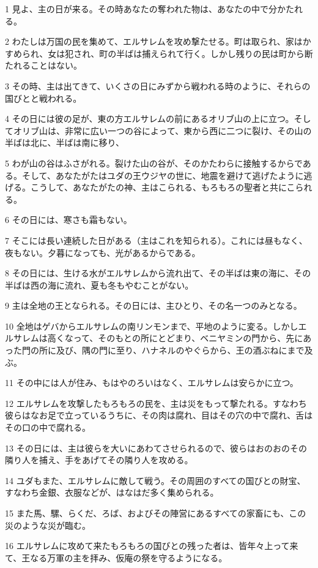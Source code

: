 \par 1 見よ、主の日が来る。その時あなたの奪われた物は、あなたの中で分かたれる。
\par 2 わたしは万国の民を集めて、エルサレムを攻め撃たせる。町は取られ、家はかすめられ、女は犯され、町の半ばは捕えられて行く。しかし残りの民は町から断たれることはない。
\par 3 その時、主は出てきて、いくさの日にみずから戦われる時のように、それらの国びとと戦われる。
\par 4 その日には彼の足が、東の方エルサレムの前にあるオリブ山の上に立つ。そしてオリブ山は、非常に広い一つの谷によって、東から西に二つに裂け、その山の半ばは北に、半ばは南に移り、
\par 5 わが山の谷はふさがれる。裂けた山の谷が、そのかたわらに接触するからである。そして、あなたがたはユダの王ウジヤの世に、地震を避けて逃げたように逃げる。こうして、あなたがたの神、主はこられる、もろもろの聖者と共にこられる。
\par 6 その日には、寒さも霜もない。
\par 7 そこには長い連続した日がある（主はこれを知られる）。これには昼もなく、夜もない。夕暮になっても、光があるからである。
\par 8 その日には、生ける水がエルサレムから流れ出て、その半ばは東の海に、その半ばは西の海に流れ、夏も冬もやむことがない。
\par 9 主は全地の王となられる。その日には、主ひとり、その名一つのみとなる。
\par 10 全地はゲバからエルサレムの南リンモンまで、平地のように変る。しかしエルサレムは高くなって、そのもとの所にとどまり、ベニヤミンの門から、先にあった門の所に及び、隅の門に至り、ハナネルのやぐらから、王の酒ぶねにまで及ぶ。
\par 11 その中には人が住み、もはやのろいはなく、エルサレムは安らかに立つ。
\par 12 エルサレムを攻撃したもろもろの民を、主は災をもって撃たれる。すなわち彼らはなお足で立っているうちに、その肉は腐れ、目はその穴の中で腐れ、舌はその口の中で腐れる。
\par 13 その日には、主は彼らを大いにあわてさせられるので、彼らはおのおのその隣り人を捕え、手をあげてその隣り人を攻める。
\par 14 ユダもまた、エルサレムに敵して戦う。その周囲のすべての国びとの財宝、すなわち金銀、衣服などが、はなはだ多く集められる。
\par 15 また馬、騾、らくだ、ろば、およびその陣営にあるすべての家畜にも、この災のような災が臨む。
\par 16 エルサレムに攻めて来たもろもろの国びとの残った者は、皆年々上って来て、王なる万軍の主を拝み、仮庵の祭を守るようになる。
